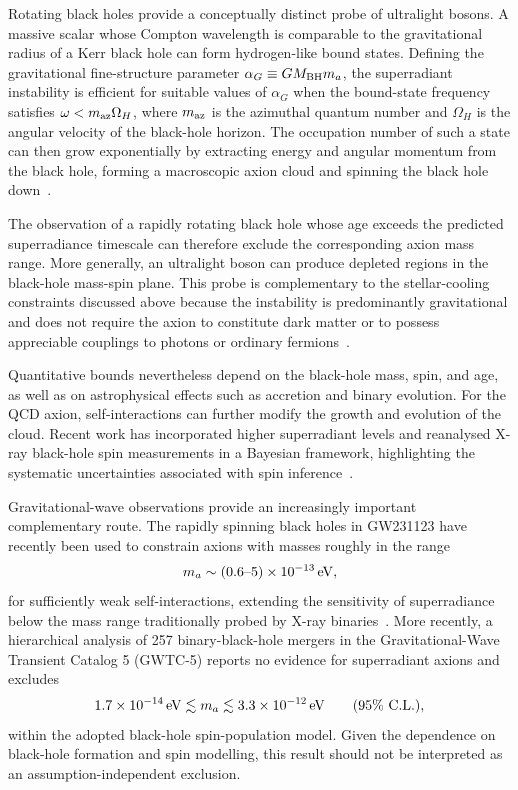 \documentclass[review]{elsarticle}
\numberwithin{equation}{section}
\numberwithin{table}{section}
\numberwithin{figure}{section}
\begin{document}
Rotating black holes provide a conceptually distinct probe of ultralight bosons. A massive scalar whose Compton wavelength is comparable to the gravitational radius of a Kerr black hole can form hydrogen-like bound states. Defining the gravitational fine-structure parameter $\alpha_G\equiv G M_{\rm BH}m_a$, the superradiant instability is efficient for suitable values of $\alpha_G$ when the bound-state frequency satisfies
$\omega<m_{\rm az}\Omega_H$,
where $m_{\rm az}$ is the azimuthal quantum number and $\Omega_H$ is the angular velocity of the black-hole horizon. The occupation number of such a state can then grow exponentially by extracting energy and angular momentum from the black hole, forming a macroscopic axion cloud and spinning the black hole down~\cite{Arvanitaki:2010sy,Brito:2015oca,Arvanitaki:2014wva}.

The observation of a rapidly rotating black hole whose age exceeds the predicted superradiance timescale can therefore exclude the corresponding axion mass range. More generally, an ultralight boson can produce depleted regions in the black-hole mass-spin plane. This probe is complementary to the stellar-cooling constraints discussed above because the instability is predominantly gravitational and does not require the axion to constitute dark matter or to possess appreciable couplings to photons or ordinary fermions~\cite{Arvanitaki:2010sy,Arvanitaki:2014wva,Caputo:2024oqc}.

Quantitative bounds nevertheless depend on the black-hole mass, spin, and age, as well as on astrophysical effects such as accretion and binary evolution. For the QCD axion, self-interactions can further modify the growth and evolution of the cloud. Recent work has incorporated higher superradiant levels and reanalysed X-ray black-hole spin measurements in a Bayesian framework, highlighting the systematic uncertainties associated with spin inference~\cite{Witte:2024drg}.

Gravitational-wave observations provide an increasingly important complementary route. The rapidly spinning black holes in GW231123 have recently been used to constrain axions with masses roughly in the range
\begin{align}
    m_a
    \sim
    (0.6\text{--}5)\times10^{-13}\,{\rm eV},
\end{align}
for sufficiently weak self-interactions, extending the sensitivity of superradiance below the mass range traditionally probed by X-ray binaries~\cite{Caputo:2025oap}. More recently, a hierarchical analysis of 257 binary-black-hole mergers in the Gravitational-Wave Transient Catalog 5 (GWTC-5) reports no evidence for superradiant axions and excludes~\cite{Ning:2026ebu}
\begin{align}
    1.7\times10^{-14}\,{\rm eV}
    \lesssim
    m_a
    \lesssim
    3.3\times10^{-12}\,{\rm eV}
    \qquad
    (95\%~{\rm C.L.}),
    \label{eq:GWTC5-superradiance-bound}
\end{align}
within the adopted black-hole spin-population model. Given the dependence on black-hole formation and spin modelling, this result should not be interpreted as an assumption-independent exclusion.
\end{document}

